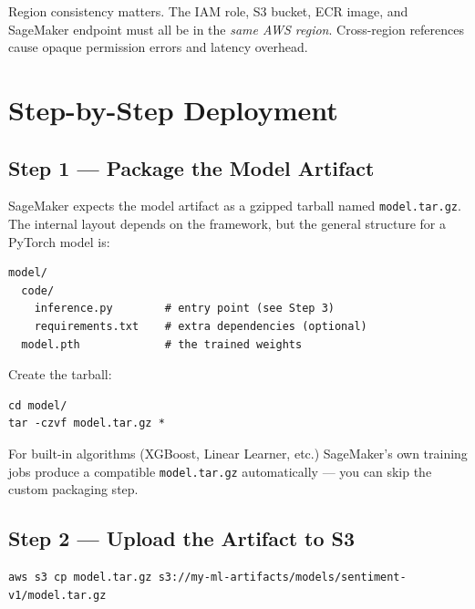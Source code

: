 \documentclass[11pt,a4paper]{article}
\begin{document}
\begin{warnbox}
Region consistency matters. The IAM role, S3 bucket, ECR image, and SageMaker
endpoint must all be in the \emph{same AWS region}. Cross-region references
cause opaque permission errors and latency overhead.
\end{warnbox}

\section{Step-by-Step Deployment}

\subsection{Step 1 --- Package the Model Artifact}

SageMaker expects the model artifact as a gzipped tarball named
\texttt{model.tar.gz}. The internal layout depends on the framework, but the
general structure for a PyTorch model is:

\begin{lstlisting}[style=bashcode]
model/
  code/
    inference.py        # entry point (see Step 3)
    requirements.txt    # extra dependencies (optional)
  model.pth             # the trained weights
\end{lstlisting}

Create the tarball:

\begin{lstlisting}[style=bashcode]
cd model/
tar -czvf model.tar.gz *
\end{lstlisting}

\begin{notebox}
For built-in algorithms (XGBoost, Linear Learner, etc.) SageMaker's own training
jobs produce a compatible \texttt{model.tar.gz} automatically --- you can skip
the custom packaging step.
\end{notebox}

\subsection{Step 2 --- Upload the Artifact to S3}

\begin{lstlisting}[style=bashcode]
aws s3 cp model.tar.gz s3://my-ml-artifacts/models/sentiment-v1/model.tar.gz
\end{lstlisting}
\end{document}
